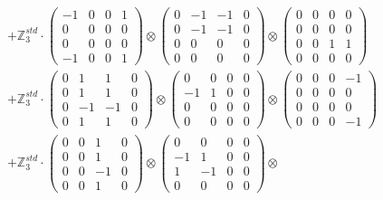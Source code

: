 \documentclass{article}
\begin{document}
{\begin{align}
        &+ \label{Rs1-Rc16-Solution-2-c4} \mathbb{Z}_3^{std} \cdot 
            \begin{pmatrix} -1 & 0 & 0 & 1 \\ 0 & 0 & 0 & 0 \\ 0 & 0 & 0 & 0 \\ -1 & 0 & 0 & 1 \end{pmatrix} \otimes 
            \begin{pmatrix} 0 & -1 & -1 & 0 \\ 0 & -1 & -1 & 0 \\ 0 & 0 & 0 & 0 \\ 0 & 0 & 0 & 0 \end{pmatrix} \otimes 
            \begin{pmatrix} 0 & 0 & 0 & 0 \\ 0 & 0 & 0 & 0 \\ 0 & 0 & 1 & 1 \\ 0 & 0 & 0 & 0 \end{pmatrix} \\ 
        &+ \label{Rs1-Rc16-Solution-2-c5} \mathbb{Z}_3^{std} \cdot 
            \begin{pmatrix} 0 & 1 & 1 & 0 \\ 0 & 1 & 1 & 0 \\ 0 & -1 & -1 & 0 \\ 0 & 1 & 1 & 0 \end{pmatrix} \otimes 
            \begin{pmatrix} 0 & 0 & 0 & 0 \\ -1 & 1 & 0 & 0 \\ 0 & 0 & 0 & 0 \\ 0 & 0 & 0 & 0 \end{pmatrix} \otimes 
            \begin{pmatrix} 0 & 0 & 0 & -1 \\ 0 & 0 & 0 & 0 \\ 0 & 0 & 0 & 0 \\ 0 & 0 & 0 & -1 \end{pmatrix} \\ 
        &+ \label{Rs1-Rc16-Solution-2-c6} \mathbb{Z}_3^{std} \cdot 
            \begin{pmatrix} 0 & 0 & 1 & 0 \\ 0 & 0 & 1 & 0 \\ 0 & 0 & -1 & 0 \\ 0 & 0 & 1 & 0 \end{pmatrix} \otimes 
            \begin{pmatrix} 0 & 0 & 0 & 0 \\ -1 & 1 & 0 & 0 \\ 1 & -1 & 0 & 0 \\ 0 & 0 & 0 & 0 \end{pmatrix} \otimes 

\end{align}}
\end{document}
